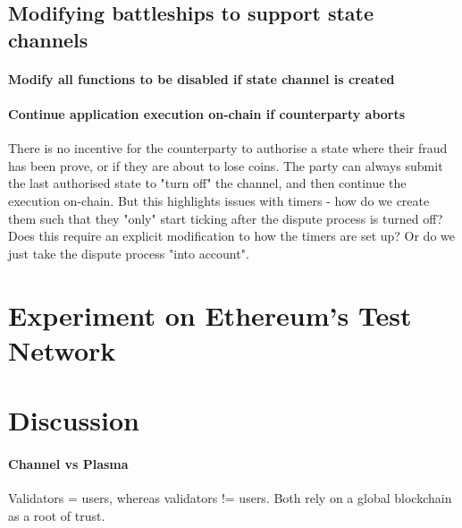 \documentclass{llncs}
\newcommand{\gamestatus}{\mathsf{phase}}
\newcommand{\gamewinner}{\mathsf{WIN}}
\begin{document}



\subsection{Modifying battleships to support state channels}

\paragraph{Modify all functions to be disabled if state channel is created}

\paragraph{Continue application execution on-chain if counterparty aborts}
There is no incentive for the counterparty to authorise a state where their fraud has been prove, or if they are about to lose coins. The party can always submit the last authorised state to "turn off" the channel, and then continue the execution on-chain. But this highlights issues with timers - how do we create them such that they "only" start ticking after the dispute process is turned off? Does this require an explicit modification to how the timers are set up? Or do we just take the dispute process "into account". 

\section{Experiment on Ethereum's Test Network}

\section{Discussion} 

\paragraph{Channel vs Plasma} Validators = users, whereas validators != users. Both rely on a global blockchain as a root of trust. 
\end{document}
